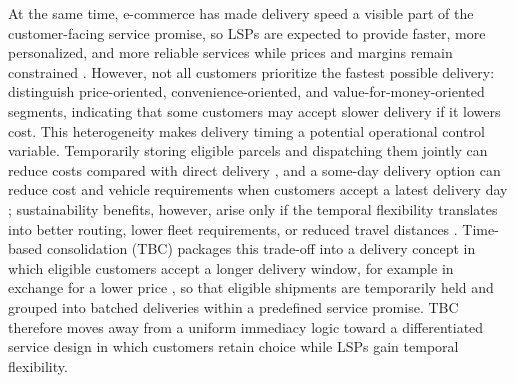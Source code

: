 \documentclass[preprint,12pt,authoryear]{elsarticle}
\begin{document}
At the same time, e-commerce has made delivery speed a visible part of the customer-facing service promise, so LSPs are expected to provide faster, more personalized, and more reliable services while prices and margins remain constrained \citep{Vivaldini}. However, not all customers prioritize the fastest possible delivery: \citet{Nguyen19} distinguish price-oriented, convenience-oriented, and value-for-money-oriented segments, indicating that some customers may accept slower delivery if it lowers cost. This heterogeneity makes delivery timing a potential operational control variable. Temporarily storing eligible parcels and dispatching them jointly can reduce costs compared with direct delivery \citep{PENG2023109044}, and a some-day delivery option can reduce cost and vehicle requirements when customers accept a latest delivery day \citep{Voigt2025SomeDayDelivery}; sustainability benefits, however, arise only if the temporal flexibility translates into better routing, lower fleet requirements, or reduced travel distances \citep{Zeelenberg2026WillingnessToWait}. Time-based consolidation (TBC) packages this trade-off into a delivery concept in which eligible customers accept a longer delivery window, for example in exchange for a lower price \citep{Naeimian2026TemporalConsolidation}, so that eligible shipments are temporarily held and grouped into batched deliveries within a predefined service promise. TBC therefore moves away from a uniform immediacy logic toward a differentiated service design in which customers retain choice while LSPs gain temporal flexibility.
\end{document}
